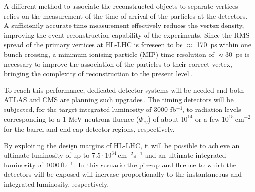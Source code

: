 \documentclass[review,number,sort&compress]{elsarticle}
\begin{document}
A different method to associate the reconstructed objects to separate vertices relies on the measurement of the time of arrival of the particles at the detectors.
A sufficiently accurate time measurement effectively reduces the vertex density, improving the event reconstruction capability of the experiments.
Since the RMS spread of the primary vertices at HL-LHC is foreseen to be $\approx$ 170~ps within one bunch crossing, a minimum ionising particle (MIP) time resolution of $\approx 30$~ps is necessary to improve the association of the particles to their correct vertex, bringing the complexity of reconstruction to the present level\,\cite{cmsMIPtiming,atlasMIPtiming}.

To reach this performance, dedicated detector systems will be needed and both ATLAS and CMS are planning such upgrades\,\cite{cmsMIPtiming,atlasMIPtiming}.
The timing detectors will be subjected, for the target integrated luminosity of 3000 fb$^{-1}$, to radiation levels corresponding to a 1-MeV neutrons fluence ($\Phi_{eq}$) of about $10^{14}$ or a few $10^{15}$\,cm$^{-2}$ for the barrel and end-cap detector regions, respectively.

By exploiting the design margins of HL-LHC, it will be possible to achieve an ultimate luminosity of up to $7.5 \cdot 10^{34}$\,cm$^{-2}$s$^{-1}$ and an ultimate integrated luminosity of 4000\,fb$^{-1}$\,\cite{hlLhcTecDesRep}.
In this scenario the pile-up and fluence to which the detectors will be exposed will increase proportionally to the instantaneous and integrated luminosity, respectively.
\end{document}
